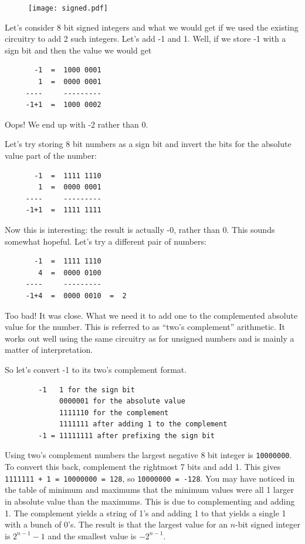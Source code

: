 \documentclass[11pt,b5paper]{book}
\begin{document}
\begin{figure}[h!]
\centering\texttt{[image: signed.pdf]}
\end{figure}

Let's consider 8 bit signed integers and what we would get if we used the
existing circuitry to add 2 such integers.
Let's add -1 and 1.
Well, if we store -1 with a sign bit and then the value we would get
\begin{verbatim}
       -1  =  1000 0001
        1  =  0000 0001
     ----     ---------
     -1+1  =  1000 0002
\end{verbatim}
Oops!  We end up with -2 rather than 0.

Let's try storing 8 bit numbers as a sign bit and invert the bits for 
the absolute value part of the number:
\begin{verbatim}
       -1  =  1111 1110
        1  =  0000 0001
     ----     ---------
     -1+1  =  1111 1111
\end{verbatim}
Now this is interesting: the result is actually -0, rather than 0.
This sounds somewhat hopeful.
Let's try a different pair of numbers:
\begin{verbatim}
       -1  =  1111 1110
        4  =  0000 0100
     ----     ---------
     -1+4  =  0000 0010  =  2
\end{verbatim}
Too bad!  It was close.  What we need it to add one to the complemented
absolute value for the number.
This is referred to as ``two's complement'' arithmetic.
It works out well using the same circuitry as for unsigned numbers and is
mainly a matter of interpretation.

So let's convert -1 to its two's complement format.
\begin{verbatim}
        -1   1 for the sign bit
             0000001 for the absolute value
             1111110 for the complement
             1111111 after adding 1 to the complement
        -1 = 11111111 after prefixing the sign bit
\end{verbatim}

Using two's complement numbers the largest negative 8 bit integer is
{\tt 10000000}.  To convert this back, complement the rightmost 7 bits and add
1.  This gives {\tt 1111111 + 1 = 10000000 = 128}, so {\tt 10000000 = -128}.
You may have noticed in the table of minimum and maximums that the minimum
values were all 1 larger in absolute value than the maximums.
This is due to complementing and adding 1.
The complement yields a string of 1's and adding 1 to that yields a single 1
with a bunch of 0's.
The result is that the largest value for an $n$-bit signed integer is
$2^{n-1}-1$ and the smallest value is $-2^{n-1}$.
\end{document}
